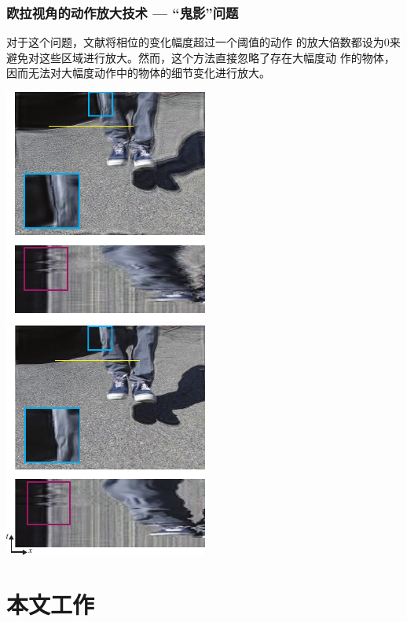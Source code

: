 \documentclass[xcolor=svgnames,serif,table]{beamer}
\begin{document}
\begin{frame}
  \frametitle{欧拉视角的动作放大技术 --- “鬼影”问题}
  \small
  
  对于这个问题，文献\cite{Wadhwa2013PhaseBased}将相位的变化幅度超过一个阈值的动作
  的放大倍数都设为0来避免对这些区域进行放大。然而，这个方法直接忽略了存在大幅度动
  作的物体，因而无法对大幅度动作中的物体的细节变化进行放大。

  \begin{center}
    \includegraphics[width=.4\textwidth]{ignore.pdf}
    ~
    \includegraphics[width=.4\textwidth]{ignore2.pdf}
  \end{center}
    
\end{frame}

\section{本文工作}
\end{document}
